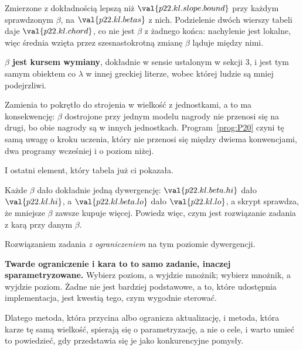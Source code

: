 \begin{fr}
\ans{$\beta$}
Zmierzone z dokładnością lepszą niż $\val{p22.kl.slope.bound}$ przy każdym
sprawdzonym $\beta$, na $\val{p22.kl.betas}$ z nich. Podzielenie dwóch wierszy
tabeli daje $\val{p22.kl.chord}$, co nie jest $\beta$ z żadnego końca:
nachylenie jest lokalne, więc średnia wzięta przez szesnastokrotną zmianę
$\beta$ ląduje między nimi.

\textbf{$\beta$ jest kursem wymiany}, dokładnie w sensie ustalonym w sekcji 3,
i jest tym samym obiektem co
$\lambda$ w innej greckiej literze, wobec której ludzie są mniej podejrzliwi.

Zamienia to pokrętło do strojenia w wielkość z jednostkami, a to ma
konsekwencję: $\beta$ dostrojone przy jednym modelu nagrody nie przenosi się na
drugi, bo obie nagrody są w innych jednostkach. Program~\ref{prog:P20} czyni tę
samą uwagę o kroku uczenia, który nie przenosi się między dwiema konwencjami,
dwa programy wcześniej i o poziom niżej.
\end{fr}

\begin{fr}
I ostatni element, który tabela już ci pokazała.

Każde $\beta$ dało dokładnie jedną dywergencję: $\val{p22.kl.beta.hi}$ dało
$\val{p22.kl.hi}$, a $\val{p22.kl.beta.lo}$ dało $\val{p22.kl.lo}$, a skrypt
sprawdza, że mniejsze $\beta$ zawsze kupuje więcej. Powiedz więc, czym jest
rozwiązanie zadania z karą przy danym $\beta$.
\nextframe
\end{fr}

\begin{fr}
\begin{ansblock}
Rozwiązaniem zadania \emph{z ograniczeniem} na tym poziomie dywergencji.
\end{ansblock}

\textbf{Twarde ograniczenie i kara to to samo zadanie, inaczej
sparametryzowane.} Wybierz poziom, a wyjdzie mnożnik; wybierz mnożnik, a wyjdzie
poziom. Żadne nie jest bardziej podstawowe, a to, które udostępnia
implementacja, jest kwestią tego, czym wygodnie sterować.

Dlatego metoda, która przycina albo ogranicza aktualizację, i metoda, która
karze
tę samą wielkość, spierają się o parametryzację, a nie o cele, i warto umieć to
powiedzieć, gdy przedstawia się je jako konkurencyjne pomysły.
\end{fr}

